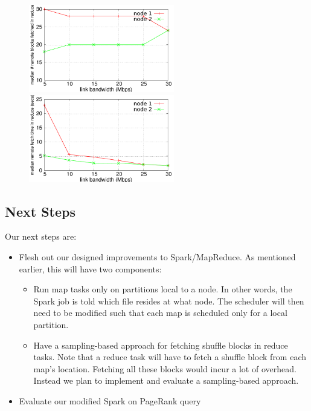 \begin{figure}[ht]
	\centering
	\begin{minipage}[b]{0.48\linewidth}
		\includegraphics[width=2.5in]{figs/reduce-blocks.pdf}
		\caption{}
		\label{fig:reduce-blocks}
	\end{minipage}
	\quad
	\begin{minipage}[b]{0.48\linewidth}
		\includegraphics[width=2.5in]{figs/reduce-time.pdf}
		\caption{}
		\label{fig:reduce-time}
	\end{minipage}
\end{figure}

\subsection{Next Steps}

Our next steps are:

\begin{itemize}
\item Flesh out our designed improvements to Spark/MapReduce. As mentioned earlier, this will have two components:
\begin{itemize}
\item Run map tasks only on partitions local to a node. In other words, the Spark job is told which file resides at what node. The scheduler will then need to be modified such that each map is scheduled only for a local partition.
\item Have a sampling-based approach for fetching shuffle blocks in reduce tasks. Note that a reduce task will have to fetch a shuffle block from each map's location. Fetching all these blocks would incur a lot of overhead. Instead we plan to implement and evaluate a sampling-based approach.
\end{itemize} 
\item Evaluate our modified Spark on PageRank query
\end{itemize}

